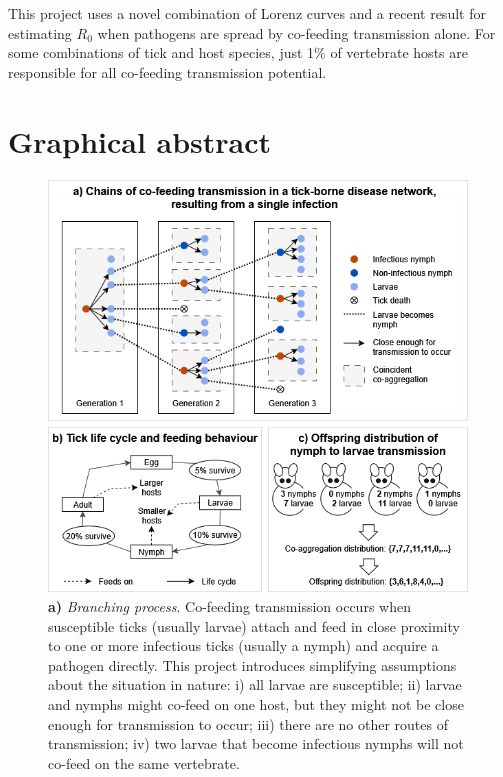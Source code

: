 \documentclass[hidelinks]{article}
\begin{document}
This project uses a novel combination of Lorenz curves and a recent result for estimating $ R_0 $ when pathogens are spread by co-feeding transmission alone. For some combinations of tick and host species, just 1\% of vertebrate hosts are responsible for all co-feeding transmission potential.

\thispagestyle{empty}
\addtocounter{page}{-1}

\newpage

\section*{Graphical abstract}

\begin{figure}[h!]
	\begin{mdframed}[backgroundcolor=grey250,rightline=false,leftline=false,topline=false]
	    \includegraphics[width=0.99\textwidth, center]{graphical_abstract_mk2.drawio}
	    \caption{
	    \textbf{a)} \textit{Branching process}. Co-feeding transmission  occurs when susceptible ticks (usually larvae) attach and feed in close proximity to one or more infectious ticks (usually a nymph) and acquire a pathogen directly. This project introduces simplifying assumptions about the situation in nature: i) all larvae are susceptible; ii) larvae and nymphs might co-feed on one host, but they might not be close enough for transmission to occur; iii) there are no other routes of transmission; iv) two larvae that become infectious nymphs will not co-feed on the same vertebrate. \\ 
}
\end{mdframed}
\end{figure}
\end{document}
